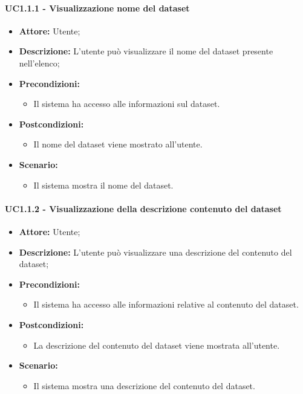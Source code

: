 \paragraph{UC1.1.1 - Visualizzazione nome del dataset}
\begin{itemize}
    \item \textbf{Attore:} Utente;
    \item \textbf{Descrizione:} L'utente può visualizzare il nome del dataset presente nell'elenco;
    \item \textbf{Precondizioni:}
    \begin{itemize}
        \item Il sistema ha accesso alle informazioni sul dataset.
    \end{itemize}
    \item \textbf{Postcondizioni:}
    \begin{itemize}
        \item Il nome del dataset viene mostrato all'utente.
    \end{itemize}
    \item \textbf{Scenario:}
    \begin{itemize}
        \item Il sistema mostra il nome del dataset.
    \end{itemize}
\end{itemize}
\paragraph{UC1.1.2 - Visualizzazione della descrizione contenuto del dataset}
\begin{itemize}
    \item \textbf{Attore:} Utente;
    \item \textbf{Descrizione:} L'utente può visualizzare una descrizione del contenuto del dataset;
    \item \textbf{Precondizioni:}
    \begin{itemize}
        \item Il sistema ha accesso alle informazioni relative al contenuto del dataset.
    \end{itemize}
    \item \textbf{Postcondizioni:}
    \begin{itemize}
        \item La descrizione del contenuto del dataset viene mostrata all'utente.
    \end{itemize}
    \item \textbf{Scenario:}
    \begin{itemize}
        \item Il sistema mostra una descrizione del contenuto del dataset.
    \end{itemize}
\end{itemize}

